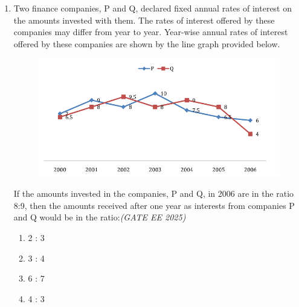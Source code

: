 \begin{enumerate}[leftmargin=0pt,label=\textbf{Q.\arabic*}, resume]

\item Two finance companies, P and Q, declared fixed annual rates of interest on the amounts invested with them. The rates of interest offered by these companies may differ from year to year. Year-wise annual rates of interest offered by these companies are shown by the line graph provided below.

\vspace{1em}
\begin{figure}
    \centering
    \includegraphics[width=0.9\linewidth]{figs/imageQ6.png}
\end{figure}
\vspace{1em}
\newpage
If the amounts invested in the companies, P and Q, in 2006 are in the ratio 8:9, then the amounts received after one year as interests from companies P and Q would be in the ratio:\hfill \textit{(GATE EE 2025)}

\begin{multicols}{2}
\begin{enumerate}[label=(\Alph*)]
\item 2 : 3
\item 3 : 4
\item 6 : 7
\item 4 : 3
\end{enumerate}
\end{multicols}


\end{enumerate}

